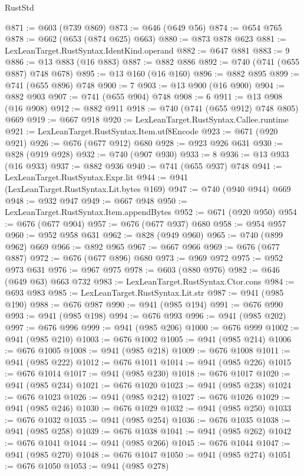 \begin{lexlean}{RustStd}
\begin{coremodule}
@871 := @603 (@739 @869)
@873 := @646 (@649 @56)
@874 := @654 @765
@878 := @662 (@653 (@874 @625) @663)
@880 := @873 @878 @623
@881 := LexLeanTarget.RustSyntax.IdentKind.operand
@882 := @647 @881
@883 := 9
@886 := @13 @883 (@16 @883)
@887 := @882 @886
@892 := @740 (@741 (@655 @887) @748 @678)
@895 := @13 @160 (@16 @160)
@896 := @882 @895
@899 := @741 (@655 @896) @748
@900 := 7
@903 := @13 @900 (@16 @900)
@904 := @882 @903
@907 := @741 (@655 @904) @748
@908 := 6
@911 := @13 @908 (@16 @908)
@912 := @882 @911
@918 := @740 (@741 (@655 @912) @748 @805) @669
@919 := @667 @918
@920 := LexLeanTarget.RustSyntax.Callee.runtime
@921 := LexLeanTarget.RustSyntax.Item.utf8Encode
@923 := @671 (@920 @921)
@926 := @676 (@677 @912) @680
@928 := @923 @926 @631
@930 := @828 (@919 @928)
@932 := @740 (@907 @930)
@933 := 8
@936 := @13 @933 (@16 @933)
@937 := @882 @936
@940 := @741 (@655 @937) @748
@941 := LexLeanTarget.RustSyntax.Expr.lit
@944 := @941 (LexLeanTarget.RustSyntax.Lit.bytes @169)
@947 := @740 (@940 @944) @669
@948 := @932 @947
@949 := @667 @948
@950 := LexLeanTarget.RustSyntax.Item.appendBytes
@952 := @671 (@920 @950)
@954 := @676 (@677 @904)
@957 := @676 (@677 @937) @680
@958 := @954 @957
@960 := @952 @958 @631
@962 := @828 (@949 @960)
@965 := @740 (@899 @962) @669
@966 := @892 @965
@967 := @667 @966
@969 := @676 (@677 @887)
@972 := @676 (@677 @896) @680
@973 := @969 @972
@975 := @952 @973 @631
@976 := @967 @975
@978 := @603 (@880 @976)
@982 := @646 (@649 @63) @663 @732
@983 := LexLeanTarget.RustSyntax.Ctor.cons
@984 := @693 @983
@985 := LexLeanTarget.RustSyntax.Lit.str
@987 := @941 (@985 @190)
@988 := @676 @987
@990 := @941 (@985 @194)
@991 := @676 @990
@993 := @941 (@985 @198)
@994 := @676 @993
@996 := @941 (@985 @202)
@997 := @676 @996
@999 := @941 (@985 @206)
@1000 := @676 @999
@1002 := @941 (@985 @210)
@1003 := @676 @1002
@1005 := @941 (@985 @214)
@1006 := @676 @1005
@1008 := @941 (@985 @218)
@1009 := @676 @1008
@1011 := @941 (@985 @222)
@1012 := @676 @1011
@1014 := @941 (@985 @226)
@1015 := @676 @1014
@1017 := @941 (@985 @230)
@1018 := @676 @1017
@1020 := @941 (@985 @234)
@1021 := @676 @1020
@1023 := @941 (@985 @238)
@1024 := @676 @1023
@1026 := @941 (@985 @242)
@1027 := @676 @1026
@1029 := @941 (@985 @246)
@1030 := @676 @1029
@1032 := @941 (@985 @250)
@1033 := @676 @1032
@1035 := @941 (@985 @254)
@1036 := @676 @1035
@1038 := @941 (@985 @258)
@1039 := @676 @1038
@1041 := @941 (@985 @262)
@1042 := @676 @1041
@1044 := @941 (@985 @266)
@1045 := @676 @1044
@1047 := @941 (@985 @270)
@1048 := @676 @1047
@1050 := @941 (@985 @274)
@1051 := @676 @1050
@1053 := @941 (@985 @278)

\end{coremodule}
\end{lexlean}
